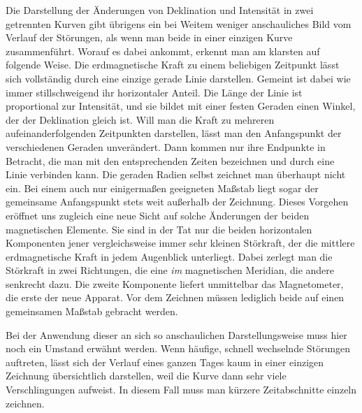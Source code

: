 Die Darstellung der Änderungen von Deklination und Intensität in zwei getrennten Kurven gibt übrigens ein bei Weitem weniger anschauliches Bild vom Verlauf der Störungen, als wenn man beide in einer einzigen Kurve zusammenführt. Worauf es dabei ankommt, erkennt man am klarsten auf folgende Weise. Die erdmagnetische Kraft zu einem beliebigen Zeitpunkt lässt sich vollständig durch eine einzige gerade Linie darstellen. Gemeint ist dabei wie immer stillschweigend ihr horizontaler Anteil. Die Länge der Linie ist proportional zur Intensität, und sie bildet mit einer festen Geraden einen Winkel, der der Deklination gleich ist. Will man die Kraft zu mehreren aufeinanderfolgenden Zeitpunkten darstellen, lässt man den Anfangspunkt der verschiedenen Geraden unverändert. Dann kommen nur ihre Endpunkte in Betracht, die man mit den entsprechenden Zeiten bezeichnen und durch eine Linie verbinden kann. Die geraden Radien selbst zeichnet man überhaupt nicht ein. Bei einem auch nur einigermaßen geeigneten Maßstab liegt sogar der gemeinsame Anfangspunkt stets weit außerhalb der Zeichnung. Dieses Vorgehen eröffnet uns zugleich eine neue Sicht auf solche Änderungen der beiden magnetischen Elemente. Sie sind in der Tat nur die beiden horizontalen Komponenten jener vergleichsweise immer sehr kleinen Störkraft, der die mittlere erdmagnetische Kraft in jedem Augenblick unterliegt. Dabei zerlegt man die Störkraft in zwei Richtungen, die eine \textit{im} magnetischen Meridian, die andere senkrecht dazu. Die zweite Komponente liefert unmittelbar das Magnetometer, die erste der neue Apparat. Vor dem Zeichnen müssen lediglich beide auf einen gemeinsamen Maßstab gebracht werden.

Bei der Anwendung dieser an sich so anschaulichen Darstellungsweise muss hier noch ein Umstand erwähnt werden. Wenn häufige, schnell wechselnde Störungen auftreten, lässt sich der Verlauf eines ganzen Tages kaum in einer einzigen Zeichnung übersichtlich darstellen, weil die Kurve dann sehr viele Verschlingungen aufweist. In diesem Fall muss man kürzere Zeitabschnitte einzeln zeichnen.

